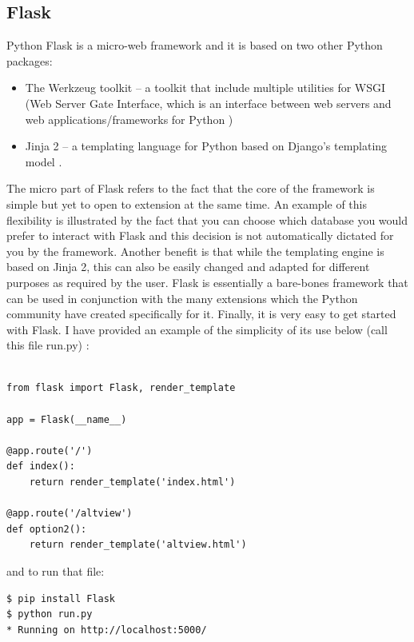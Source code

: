 \subsection{Flask}
Python Flask is a micro-web framework and it is based on two other Python packages:
\begin{itemize}
	\item The Werkzeug toolkit – a toolkit that include multiple utilities for WSGI (Web Server Gate Interface, which is an interface between web servers and web applications/frameworks for Python \cite{werkzeug})
	\item Jinja 2 – a templating language for Python based on Django’s templating model \cite{jinja2}.
\end{itemize}
The micro part of Flask refers to the fact that the core of the framework is simple but yet to open to extension at the same time. An example of this flexibility is illustrated by the fact that you can choose which database you would prefer to interact with Flask and this decision is not automatically dictated for you by the framework. Another benefit is that while the templating engine is based on Jinja 2, this can also be easily changed and adapted for different purposes as required by the user. Flask is essentially a bare-bones framework that can be used in conjunction with the many extensions which the Python community have created specifically for it. Finally, it is very easy to get started with Flask. I have provided an example of the simplicity of its use below (call this file run.py) \cite{flask}:
\linebreak
\linebreak
\linebreak
\begin{verbatim}

from flask import Flask, render_template

app = Flask(__name__)

@app.route('/')
def index():
	return render_template('index.html')

@app.route('/altview')
def option2():
	return render_template('altview.html')
\end{verbatim}
and to run that file:
\begin{verbatim}
$ pip install Flask
$ python run.py
* Running on http://localhost:5000/
\end{verbatim}

